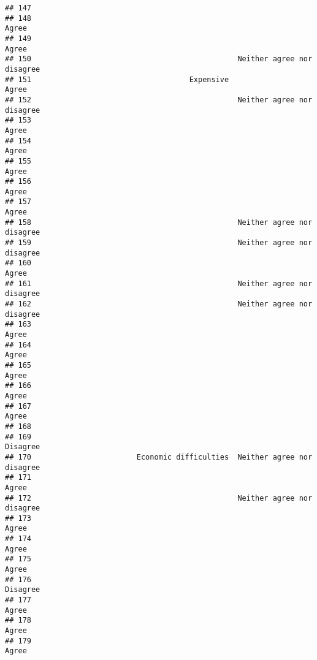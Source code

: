 \documentclass[
]{article}
\begin{document}
\begin{verbatim}
## 147                                                                         
## 148                                                                    Agree
## 149                                                                    Agree
## 150                                               Neither agree nor disagree
## 151                                    Expensive                       Agree
## 152                                               Neither agree nor disagree
## 153                                                                    Agree
## 154                                                                    Agree
## 155                                                                    Agree
## 156                                                                    Agree
## 157                                                                    Agree
## 158                                               Neither agree nor disagree
## 159                                               Neither agree nor disagree
## 160                                                                    Agree
## 161                                               Neither agree nor disagree
## 162                                               Neither agree nor disagree
## 163                                                                    Agree
## 164                                                                    Agree
## 165                                                                    Agree
## 166                                                                    Agree
## 167                                                                    Agree
## 168                                                                         
## 169                                                                 Disagree
## 170                        Economic difficulties  Neither agree nor disagree
## 171                                                                    Agree
## 172                                               Neither agree nor disagree
## 173                                                                    Agree
## 174                                                                    Agree
## 175                                                                    Agree
## 176                                                                 Disagree
## 177                                                                    Agree
## 178                                                                    Agree
## 179                                                                    Agree

\end{verbatim}
\end{document}
